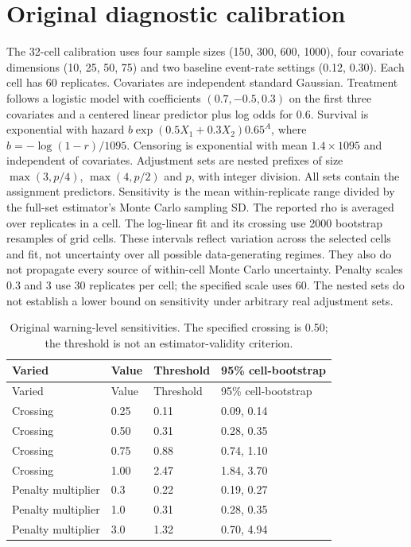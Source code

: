 \documentclass[12pt,letterpaper]{article}
\begin{document}
\section{Original diagnostic calibration}
The 32-cell calibration uses four sample sizes (150, 300, 600, 1000), four covariate dimensions
(10, 25, 50, 75) and two baseline event-rate settings (0.12, 0.30). Each cell has 60 replicates.
Covariates are independent standard Gaussian. Treatment follows a logistic model with coefficients
$(0.7,-0.5,0.3)$ on the first three covariates and a centered linear predictor plus log odds for 0.6.
Survival is exponential with hazard $b\exp(0.5X_1+0.3X_2)0.65^A$, where
$b=-\log(1-r)/1095$. Censoring is exponential with mean $1.4\times1095$ and independent of covariates.
Adjustment sets are nested prefixes of size $\max(3,p/4)$, $\max(4,p/2)$ and $p$, with integer division.
All sets contain the assignment predictors. Sensitivity is the mean within-replicate range divided by
the full-set estimator's Monte Carlo sampling SD. The reported rho is averaged over replicates in a cell.
The log-linear fit and its crossing use 2000 bootstrap resamples of grid cells. These intervals reflect
variation across the selected cells and fit, not uncertainty over all possible data-generating regimes.
They also do not propagate every source of within-cell Monte Carlo uncertainty.
Penalty scales 0.3 and 3 use 30 replicates per cell; the specified scale uses 60.
The nested sets do not establish a lower bound on sensitivity under arbitrary real adjustment sets.

\begin{longtable}{p{1.9in}p{0.65in}p{1.0in}p{2.15in}}
\caption{Original warning-level sensitivities. The specified crossing is 0.50; the threshold is not an estimator-validity criterion.}\\
\toprule
Varied & Value & Threshold & 95\% cell-bootstrap \\
\midrule\endfirsthead
\toprule
Varied & Value & Threshold & 95\% cell-bootstrap \\
\midrule\endhead
\bottomrule\endfoot
Crossing & 0.25 & 0.11 & 0.09, 0.14 \\
Crossing & 0.50 & 0.31 & 0.28, 0.35 \\
Crossing & 0.75 & 0.88 & 0.74, 1.10 \\
Crossing & 1.00 & 2.47 & 1.84, 3.70 \\
Penalty multiplier & 0.3 & 0.22 & 0.19, 0.27 \\
Penalty multiplier & 1.0 & 0.31 & 0.28, 0.35 \\
Penalty multiplier & 3.0 & 1.32 & 0.70, 4.94 \\
\end{longtable}
\end{document}
